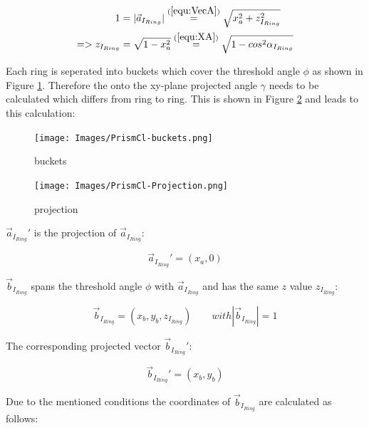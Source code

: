 \documentclass[../ClassicThesis.tex]{subfiles}
\begin{document}
\begin{equation}
\label{equ:ZIRing}
\begin{split}
    1 & = \vert \vec{a}_{I_{Ring}} \vert \stackrel{(\ref{equ:VecA})}{=} \sqrt{ x_{a}^{2} + z_{I_{Ring}}^{2} } \\
    => z_{I_{Ring}} & = \sqrt{1 - x_{a}^{2}} 
    \stackrel{(\ref{equ:XA})}{=} \sqrt{1 - cos^{2}{{\alpha}_{I_{Ring}}}}
\end{split}
\end{equation}


Each ring is seperated into buckets which cover the threshold angle $\phi$ as shown in Figure \ref{fig:PrismCl-buckets}. Therefore the onto the xy-plane projected angle $\gamma$ needs to be calculated which differs from ring to ring. This is shown in Figure \ref{fig:projection} and leads to this calculation: 

\begin{figure}
    \texttt{[image: Images/PrismCl-buckets.png]}
    \caption{buckets}
    \label{fig:PrismCl-buckets}
\end{figure}


\begin{figure}
    \texttt{[image: Images/PrismCl-Projection.png]}
    \caption{projection}
    \label{fig:projection}
\end{figure}


$ \vec{a}_{I_{Ring}}' $ is the projection of $\vec{a}_{I_{Ring}} $:


\begin{equation}
    \label{equ:VecAStrich}
    \vec{a}_{I_{Ring}}' = (x_{a}, 0)
\end{equation}

$ \vec{b}_{I_{Ring}} $ spans the threshold angle $\phi$ with $ \vec{a}_{I_{Ring}} $ and has the same $z$ value $z_{I_{Ring}}$:

\begin{equation}
    \vec{b}_{I_{Ring}} = (x_{b}, y_{b}, z_{I_{Ring}}) \qquad with | \vec{b}_{I_{Ring}}| = 1
    \label{equ:VecB}
\end{equation}

The corresponding projected vector $ \vec{b}_{I_{Ring}}' $:

\begin{equation}
    \vec{b}_{I_{Ring}}' = (x_{b}, y_{b})
    \label{equ:VecBStrich}
\end{equation}

Due to the mentioned conditions the coordinates of $ \vec{b}_{I_{Ring}} $ are calculated as follows:
\end{document}
